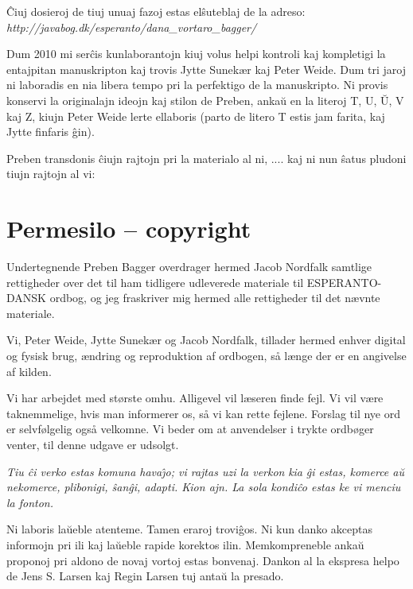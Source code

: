 {\frenchspacing
\^Ciuj dosieroj de tiuj unuaj fazoj estas el\^suteblaj de la adreso:\\
\textit{http://javabog.dk/esperanto/dana\_vortaro\_bagger/}}

{\frenchspacing
Dum 2010 mi ser\^cis kunlaborantojn kiuj volus helpi kontroli kaj
kompletigi la entajpitan manuskripton kaj trovis Jytte Sunek{\ae}r kaj
Peter Weide. Dum tri jaroj ni laboradis en nia libera tempo pri la
perfektigo de la manuskripto. Ni provis konservi la originalajn ideojn
kaj stilon de Preben, anka\u{u} en la literoj T, U, \u{U}, V kaj Z,
kiujn Peter Weide lerte ellaboris (parto de litero T estis jam farita, kaj Jytte finfaris \^gin).}

{\frenchspacing
Preben transdonis \^ciujn rajtojn pri la materialo al ni, .... kaj ni
nun \^satus pludoni tiujn rajtojn al vi:}

\section{Permesilo -- copyright}
{
Undertegnende Preben Bagger overdrager hermed Jacob Nordfalk samtlige
rettigheder over det til ham tidligere udleverede materiale til
ESPERANTO-DANSK ordbog, og jeg fraskriver mig hermed alle rettigheder
til det n{\ae}vnte materiale.}

{
Vi, Peter Weide, Jytte Sunek{\ae}r og Jacob Nordfalk, tillader hermed
enhver digital og fysisk brug, {\ae}ndring og reproduktion af ordbogen,
s{\aa} l{\ae}nge der er en angivelse af kilden.}

{
Vi har arbejdet med st{\o}rste omhu. Alligevel vil l{\ae}seren finde
fejl. Vi vil v{\ae}re taknemmelige, hvis man informerer os, s{\aa} vi
kan rette fejlene. Forslag til nye ord er selvf{\o}lgelig ogs{\aa}
velkomne. Vi beder om at anvendelser i trykte ordb{\o}ger venter, til
denne udgave er udsolgt.}

{\frenchspacing
\textit{Tiu \^ci verko estas komuna hava\^{\j}o; vi rajtas uzi la verkon
}\foreignlanguage{danish}{\textit{kia}}\textit{ \^gi estas, komerce
a\u{u} nekomerce, plibonigi, \^san\^gi, adapti. Kion ajn. La sola
kondi\^co estas ke vi menci}\textit{u}\textit{ la fonton.}}

{\frenchspacing
Ni laboris la\u{u}eble atenteme. Tamen eraroj trovi\^gos. Ni kun danko
akceptas informojn pri ili kaj la\u{u}eble rapide korektos ilin.
Memkompreneble anka\u{u} proponoj pri aldono de novaj vortoj estas
bonvenaj. Dankon al la ekspresa helpo de Jens S. Larsen kaj Regin Larsen tuj anta\u{u} la presado.}

